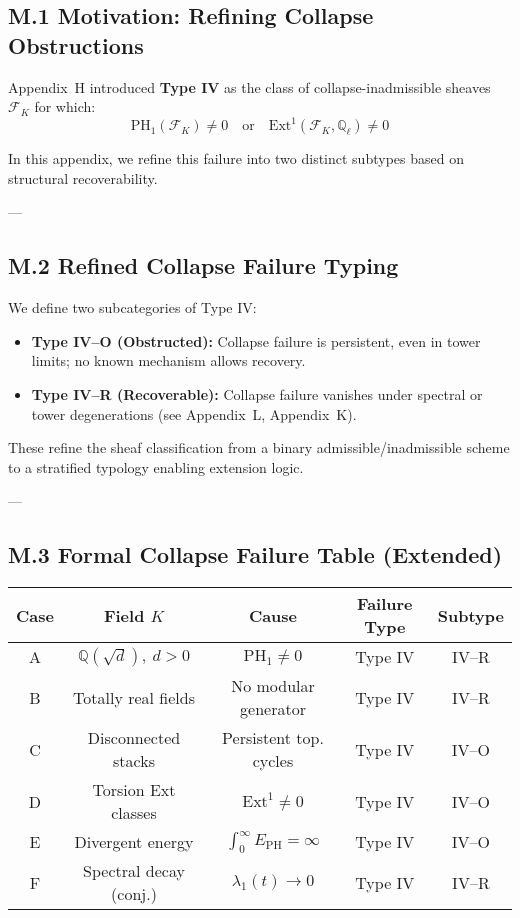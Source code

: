 \documentclass[11pt]{article}
\begin{document}
\subsection*{M.1 Motivation: Refining Collapse Obstructions}

Appendix~H introduced \textbf{Type IV} as the class of collapse-inadmissible sheaves \( \mathcal{F}_K \) for which:
\[
\mathrm{PH}_1(\mathcal{F}_K) \ne 0 \quad \text{or} \quad \mathrm{Ext}^1(\mathcal{F}_K, \mathbb{Q}_\ell) \ne 0
\]

In this appendix, we refine this failure into two distinct subtypes based on structural recoverability.

---

\subsection*{M.2 Refined Collapse Failure Typing}

We define two subcategories of Type IV:

\begin{itemize}
  \item \textbf{Type IV–O (Obstructed):} Collapse failure is persistent, even in tower limits; no known mechanism allows recovery.
  \item \textbf{Type IV–R (Recoverable):} Collapse failure vanishes under spectral or tower degenerations (see Appendix~L, Appendix~K).
\end{itemize}

These refine the sheaf classification from a binary admissible/inadmissible scheme to a stratified typology enabling extension logic.

---

\subsection*{M.3 Formal Collapse Failure Table (Extended)}

\begin{center}
\renewcommand{\arraystretch}{1.3}
\begin{tabular}{|c|c|c|c|c|}
\hline
\textbf{Case} & \textbf{Field \( K \)} & \textbf{Cause} & \textbf{Failure Type} & \textbf{Subtype} \\
\hline
A & \( \mathbb{Q}(\sqrt{d}),\ d > 0 \) & \( \mathrm{PH}_1 \ne 0 \) & Type IV & IV–R \\
B & Totally real fields & No modular generator & Type IV & IV–R \\
C & Disconnected stacks & Persistent top. cycles & Type IV & IV–O \\
D & Torsion Ext classes & \( \mathrm{Ext}^1 \ne 0 \) & Type IV & IV–O \\
E & Divergent energy & \( \int_0^\infty E_{\mathrm{PH}} = \infty \) & Type IV & IV–O \\
F & Spectral decay (conj.) & \( \lambda_1(t) \to 0 \) & Type IV & IV–R \\
\hline
\end{tabular}
\end{center}
\end{document}
